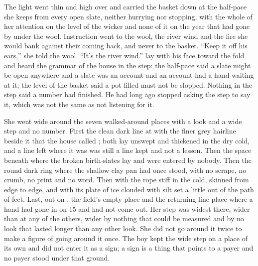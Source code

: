The light went thin and high over  and  carried the basket down at the half-pace she keeps from every open slate, neither hurrying nor stopping, with the whole of her attention on the level of the wicker and none of it on the year that had gone by under the wool. Instruction went to the wool, the river wind and the fire she would bank against their coming back, and never to the basket. “Keep it off his ears,” she told the wool. “It's the river wind.”  lay with his face toward the fold and heard the grammar of the house in the step: the half-pace said a slate might be open anywhere and a slate was an account and an account had a hand waiting at it; the level of the basket said a pot filled must not be slopped. Nothing in the step said a number had finished. He had long ago stopped asking the step to say it, which was not the same as not listening for it.

She went wide around the seven walked-around places with a look and a wide step and no number. First the clean dark line at  with the finer grey hairline beside it that the house called ; both lay unswept and thickened in the dry cold, and a line left where it was was still a line kept and not a lesson. Then the space beneath  where the broken birth-slates lay and were entered by nobody. Then the round dark ring where the shallow clay pan had once stood, with no scrape, no crumb, no print and no word. Then  with the rope stiff in the cold,  skinned from edge to edge, and  with its plate of ice clouded with silt set a little out of the path of feet. Last, out on , the field's empty place and the returning-line place where a hand had gone in on  15 and had not come out. Her step was widest there, wider than at any of the others, wider by nothing that could be measured and by no look that lasted longer than any other look. She did not go around it twice to make a figure of going around it once. The boy kept the wide step on a place of its own and did not enter it as a sign; a sign is a thing that points to a payer and no payer stood under that ground.

